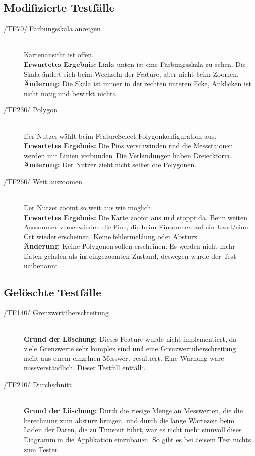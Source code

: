 \subsection{Modifizierte Testfälle}
\begin{description}
   	\item[/TF70/ Färbungsskala anzeigen] \hfill  \\  Kartenansicht ist offen. \\ \textbf{Erwartetes Ergebnis:} Links unten ist eine Färbungsskala zu sehen. Die Skala ändert sich beim Wechseln der Feature, aber nicht beim Zoomen. \\
\textbf{Änderung:} Die Skala ist immer in der rechten unteren Ecke, Anklicken ist nicht nötig und bewirkt nichts.

   	\item[/TF230/ Polygon] \hfill \\ Der Nutzer wählt beim FeatureSelect Polygonkonfiguration aus. \\ \textbf{Erwartetes Ergebnis:} Die Pins verschwinden und die Messstaionen werden mit Linien verbunden. Die Verbindungen haben Dreieckform. \\
\textbf{Änderung:} Der Nutzer zieht nicht selber die Polygonen.

\item[/TF260/ Weit auszoomen] \hfill \\ Der Nutzer zoomt so weit aus wie möglich.\\ \textbf{Erwartetes Ergebnis:} Die Karte zoomt aus und stoppt da. Beim weiten Auszoomen verschwinden die Pins, die beim Einzoomen auf ein Land/eine Ort wieder erscheinen. Keine fehlermeldung oder Absturz. \\
\textbf{Änderung:} Keine Polygonen sollen erscheinen. Es werden nicht mehr Daten geladen als im eingezoomten Zustand, deswegen wurde der Test umbenannt.
\end{description}

\subsection{Gelöschte Testfälle}

\begin{description}
  \item[/TF140/ Grenzwertüberschreitung] \hfill \\ 
  \textbf{Grund der Löschung:} Dieses Feature wurde nicht implementiert, da viele Grenzwerte sehr komplex sind und eine Grenzwertüberschreitung nicht aus einem einzelnen Messwert resultiert. Eine Warnung wäre missverständlich. Dieser Testfall entfällt.

  \item[/TF210/ Durchschnitt] \hfill \\ \textbf{Grund der Löschung:} Durch die riesige Menge an Messwerten, die die berechnung zum absturz bringen, und durch die lange Wartezeit beim Laden der Daten, die zu Timeout führt, war es nicht mehr sinnvoll dises Diagramm in die Applikation einzubauen. So gibt es bei deisem Test nichts zum Testen. 

\end{description}


